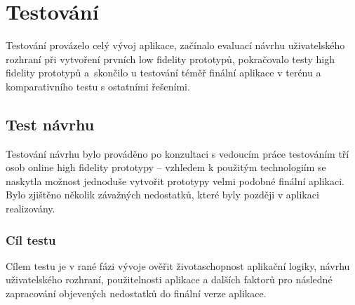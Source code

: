 
\chapter{Testování}
Testování provázelo celý vývoj aplikace, začínalo evaluací návrhu uživatelského rozhraní při vytvoření prvních low fidelity prototypů, pokračovalo testy high fidelity prototypů a~skon\-či\-lo u testování téměř finální aplikace v terénu a komparativního testu s ostatními řešeními.


\section{Test návrhu}
\label{sec:testhfp}
Testování návrhu bylo prováděno po konzultaci s vedoucím práce testováním tří osob online high fidelity prototypy -- vzhledem k použitým technologiím se naskytla možnost jednoduše vytvořit prototypy velmi podobné finální aplikaci. Bylo zjištěno několik závažných nedostatků, které byly později v aplikaci realizovány.

\subsection{Cíl testu}
Cílem testu je v rané fázi vývoje ověřit životaschopnost aplikační logiky, návrhu uživatelského rozhraní, použitelnosti aplikace a dalších faktorů pro následné zapracování objevených nedostatků do finální verze aplikace.

